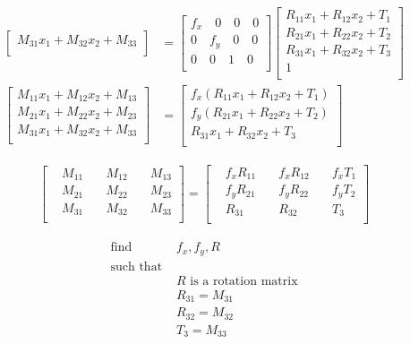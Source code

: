 \documentclass{article}
\begin{document}
\begin{align*}
\begin{bmatrix}
M_{31}x_1+M_{32}x_2+M_{33}\\
\end{bmatrix}
&=
\begin{bmatrix}
f_x\quad 0\quad 0\quad 0\\
0\quad f_y\quad 0\quad 0\\
0\quad 0\quad 1\quad 0\\
\end{bmatrix}
\begin{bmatrix}
R_{11}x_1+R_{12}x_2+T_1\\
R_{21}x_1+R_{22}x_2+T_2\\
R_{31}x_1+R_{32}x_2+T_3\\
1\\
\end{bmatrix}\\
\begin{bmatrix}
M_{11}x_1+M_{12}x_2+M_{13}\\
M_{21}x_1+M_{22}x_2+M_{23}\\
M_{31}x_1+M_{32}x_2+M_{33}\\
\end{bmatrix}
&=
\begin{bmatrix}
f_x(R_{11}x_1+R_{12}x_2+T_1)\\
f_y(R_{21}x_1+R_{22}x_2+T_2)\\
R_{31}x_1+R_{32}x_2+T_3\\
\end{bmatrix}
\end{align*}


\begin{align*}
\begin{bmatrix}
&M_{11}\quad &M_{12}\quad &M_{13}\\
&M_{21}\quad &M_{22}\quad &M_{23}\\
&M_{31}\quad &M_{32}\quad &M_{33}\\
\end{bmatrix}
=
\begin{bmatrix}
&f_xR_{11}\quad &f_xR_{12} \quad &f_xT_1\\
&f_yR_{21}\quad &f_yR_{22}\quad &f_yT_2\\
&R_{31}\quad &R_{32}\quad &T_3\\
\end{bmatrix}
\end{align*}

\begin{align*}
\text{find }& f_x, f_y, R\\
\text{such that }\\
&R \text{ is a rotation matrix}\\
&R_{31} = M_{31}\\
&R_{32} = M_{32}\\
&T_3 = M_{33}\\
\end{align*}
\end{document}
